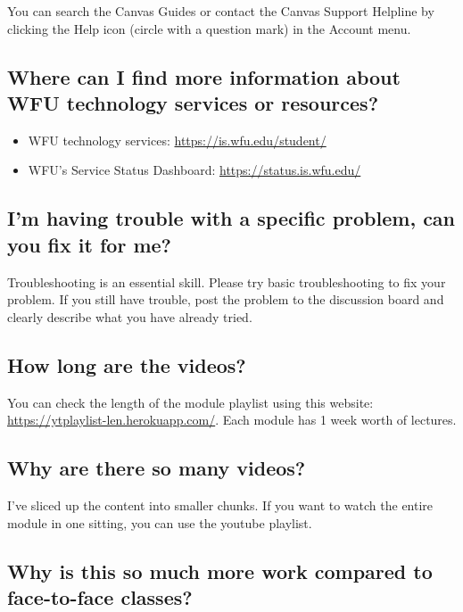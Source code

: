 \documentclass[
]{book}
\providecommand{\tightlist}{%
  \setlength{\itemsep}{0pt}\setlength{\parskip}{0pt}}
\begin{document}
You can search the Canvas Guides or contact the Canvas Support Helpline by clicking the Help icon (circle with a question mark) in the Account menu.

\subsection{Where can I find more information about WFU technology services or resources?}\label{where-can-i-find-more-information-about-wfu-technology-services-or-resources}

\begin{itemize}
\tightlist
\item
  WFU technology services: \url{https://is.wfu.edu/student/}
\item
  WFU's Service Status Dashboard: \url{https://status.is.wfu.edu/}
\end{itemize}

\subsection{I'm having trouble with a specific problem, can you fix it for me?}\label{im-having-trouble-with-a-specific-problem-can-you-fix-it-for-me}

Troubleshooting is an essential skill. Please try basic troubleshooting to fix your problem. If you still have trouble, post the problem to the discussion board and clearly describe what you have already tried.

\subsection{How long are the videos?}\label{how-long-are-the-videos}

You can check the length of the module playlist using this website: \url{https://ytplaylist-len.herokuapp.com/}. Each module has 1 week worth of lectures.

\subsection{Why are there so many videos?}\label{why-are-there-so-many-videos}

I've sliced up the content into smaller chunks. If you want to watch the entire module in one sitting, you can use the youtube playlist.

\subsection{Why is this so much more work compared to face-to-face classes?}\label{why-is-this-so-much-more-work-compared-to-face-to-face-classes}
\end{document}
